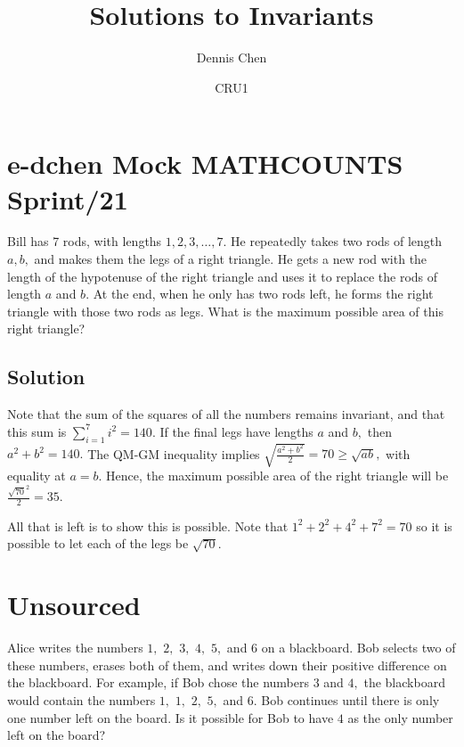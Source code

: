 \documentclass[mast]{lucky}
\title{Solutions to Invariants}
\author{Dennis Chen}
\date{CRU1}
\begin{document}
\maketitle

{\hypersetup{
    citecolor=black,
    filecolor=black,
    linkcolor=black,
    urlcolor=black}\tableofcontents
}

\pagebreak\section{e-dchen Mock MATHCOUNTS Sprint/21}

Bill has 7 rods, with lengths $1,2,3,\dots,7.$ He repeatedly takes two rods of length $a,b,$ and makes them the legs of a right triangle. He gets a new rod with the length of the hypotenuse of the right triangle and uses it to replace the rods of length $a$ and $b.$ At the end, when he only has two rods left, he forms the right triangle with those two rods as legs. What is the maximum possible area of this right triangle?

\subsection{Solution}

Note that the sum of the squares of all the numbers remains invariant, and that this sum is $\displaystyle \sum_{i=1}^7 i^2 = 140$. If the final legs have lengths $a$ and $b,$ then $a^2+b^2=140.$ The QM-GM inequality implies $\sqrt{\frac{a^2+b^2}{2}}=70 \ge \sqrt{ab},$ with equality at $a=b$. Hence, the maximum possible area of the right triangle will be $\frac{\sqrt{70}^2}{2} = 35.$

All that is left is to show this is possible. Note that $1^2 + 2^2 + 4^2 + 7^2 = 70$ so it is possible to let each of the legs be $\sqrt{70}.$

\pagebreak\section{Unsourced}

Alice writes the numbers $1,$ $2,$ $3,$ $4,$ $5,$ and $6$ on a blackboard. Bob selects two of these numbers, erases both of them, and writes down their positive difference on the blackboard. For example, if Bob chose the numbers $3$ and $4,$ the blackboard would contain the numbers $1,$ $1,$ $2,$ $5,$ and $6.$ Bob continues until there is only one number left on the board. Is it possible for Bob to have $4$ as the only number left on the board?
\end{document}
